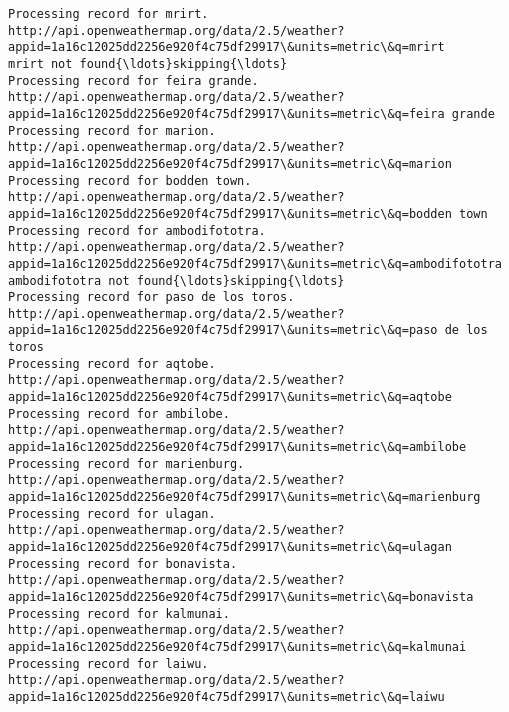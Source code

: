 \documentclass[11pt]{article}
\begin{document}
\begin{Verbatim}[commandchars=\\\{\}]
Processing record for mrirt.
http://api.openweathermap.org/data/2.5/weather?appid=1a16c12025dd2256e920f4c75df29917\&units=metric\&q=mrirt
mrirt not found{\ldots}skipping{\ldots}
Processing record for feira grande.
http://api.openweathermap.org/data/2.5/weather?appid=1a16c12025dd2256e920f4c75df29917\&units=metric\&q=feira grande
Processing record for marion.
http://api.openweathermap.org/data/2.5/weather?appid=1a16c12025dd2256e920f4c75df29917\&units=metric\&q=marion
Processing record for bodden town.
http://api.openweathermap.org/data/2.5/weather?appid=1a16c12025dd2256e920f4c75df29917\&units=metric\&q=bodden town
Processing record for ambodifototra.
http://api.openweathermap.org/data/2.5/weather?appid=1a16c12025dd2256e920f4c75df29917\&units=metric\&q=ambodifototra
ambodifototra not found{\ldots}skipping{\ldots}
Processing record for paso de los toros.
http://api.openweathermap.org/data/2.5/weather?appid=1a16c12025dd2256e920f4c75df29917\&units=metric\&q=paso de los toros
Processing record for aqtobe.
http://api.openweathermap.org/data/2.5/weather?appid=1a16c12025dd2256e920f4c75df29917\&units=metric\&q=aqtobe
Processing record for ambilobe.
http://api.openweathermap.org/data/2.5/weather?appid=1a16c12025dd2256e920f4c75df29917\&units=metric\&q=ambilobe
Processing record for marienburg.
http://api.openweathermap.org/data/2.5/weather?appid=1a16c12025dd2256e920f4c75df29917\&units=metric\&q=marienburg
Processing record for ulagan.
http://api.openweathermap.org/data/2.5/weather?appid=1a16c12025dd2256e920f4c75df29917\&units=metric\&q=ulagan
Processing record for bonavista.
http://api.openweathermap.org/data/2.5/weather?appid=1a16c12025dd2256e920f4c75df29917\&units=metric\&q=bonavista
Processing record for kalmunai.
http://api.openweathermap.org/data/2.5/weather?appid=1a16c12025dd2256e920f4c75df29917\&units=metric\&q=kalmunai
Processing record for laiwu.
http://api.openweathermap.org/data/2.5/weather?appid=1a16c12025dd2256e920f4c75df29917\&units=metric\&q=laiwu

    \end{Verbatim}
\end{document}
